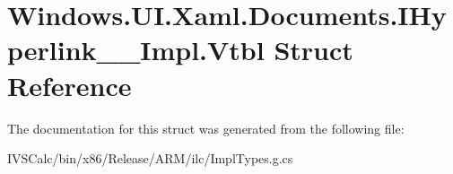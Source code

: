 \hypertarget{struct_windows_1_1_u_i_1_1_xaml_1_1_documents_1_1_i_hyperlink_____impl_1_1_vtbl}{}\section{Windows.\+U\+I.\+Xaml.\+Documents.\+I\+Hyperlink\+\_\+\+\_\+\+Impl.\+Vtbl Struct Reference}
\label{struct_windows_1_1_u_i_1_1_xaml_1_1_documents_1_1_i_hyperlink_____impl_1_1_vtbl}


The documentation for this struct was generated from the following file\+:\begin{DoxyCompactItemize}
\item 
I\+V\+S\+Calc/bin/x86/\+Release/\+A\+R\+M/ilc/Impl\+Types.\+g.\+cs\end{DoxyCompactItemize}
